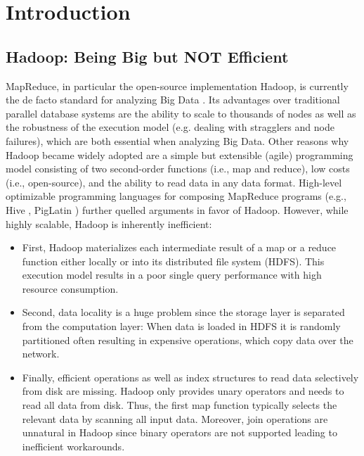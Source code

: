 \documentclass{sig-alternate}
\begin{document}
\section{Introduction}
\label{sec:intro}

\subsection{Hadoop: Being Big but NOT Efficient}
\label{sec:intro:hadoop}

MapReduce, in particular the open-source implementation Hadoop, is currently the de facto standard for analyzing Big Data \cite{MapReduce:CACM:08, Hadoop:OReilly:09}. Its advantages over traditional parallel database systems are the ability to scale to thousands of nodes as well as the robustness of the execution model (e.g. dealing with stragglers and node failures), which are both essential when analyzing Big Data. Other reasons why Hadoop became widely adopted are a simple but extensible (agile) programming model consisting of two second-order functions (i.e., map and reduce), low costs (i.e., open-source), and the ability to read data in any data format. High-level optimizable programming languages for composing MapReduce programs (e.g., Hive \cite{Hive:ICDE:2010}, PigLatin \cite{Pig:PVLDB:2009}) further quelled arguments in favor of Hadoop. However, while highly scalable, Hadoop is inherently inefficient:

\begin{itemize}
\item First, Hadoop materializes each intermediate result of a map or a reduce function either locally or into its distributed file system (HDFS). This execution model results in a poor single query performance with high resource consumption. 
\item Second, data locality is a huge problem since the storage layer is separated from the computation layer: When data is loaded in HDFS it is randomly partitioned often resulting in expensive operations, which copy data over the network.
\item Finally, efficient operations as well as index structures to read data selectively from disk are missing. Hadoop only provides unary operators and needs to read all data from disk. Thus, the first map function typically selects the relevant data by scanning all input data. Moreover, join operations are unnatural in Hadoop since binary operators are not supported leading to inefficient workarounds. 
\end{itemize}
\end{document}
